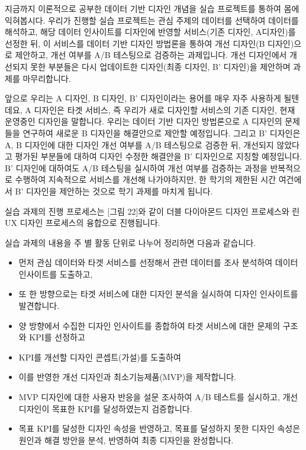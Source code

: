 \documentclass[
  letterpaper,
]{book}
\providecommand{\tightlist}{%
  \setlength{\itemsep}{0pt}\setlength{\parskip}{0pt}}\usepackage{longtable,booktabs,array}
\begin{document}
지금까지 이론적으로 공부한 데이터 기반 디자인 개념을 실습 프로젝트를
통하여 몸에 익혀봅시다. 우리가 진행할 실습 프로젝트는 관심 주제의
데이터를 선택하여 데이터를 해석하고, 해당 데이터 인사이트를 디자인에
반영할 서비스(기존 디자인, A디자인)를 선정한 뒤, 이 서비스를 데이터 기반
디자인 방법론을 통하여 개선 디자인(B 디자인)으로 제안하고, 개선 여부를
A/B 테스팅으로 검증하는 과제입니다. 개선 디자인에서 개선되지 못한
부분들은 다시 업데이트한 디자인(최종 디자인, B' 디자인)을 제안하며
과제를 마무리합니다.

앞으로 우리는 A 디자인, B 디자인, B' 디자인이라는 용어를 매우 자주
사용하게 될텐데요, A 디자인은 타겟 서비스, 즉 우리가 새로 디자인할
서비스의 기존 디자인, 현재 운영중인 디자인을 말합니다. 우리는 데이터
기반 디자인 방법론으로 A 디자인의 문제들을 연구하여 새로운 B 디자인을
해결안으로 제안할 예정입니다. 그리고 B' 디자인은 A, B 디자인에 대한
디자인 개선 여부를 A/B 테스팅으로 검증한 뒤, 개선되지 않았다고 평가된
부분들에 대하여 디자인 수정한 해결안을 B' 디자인으로 지칭할 예정입니다.
B' 디자인에 대하여도 A/B 테스팅을 실시하여 개선 여부를 검증하는 과정을
반복적으로 수행하여 지속적으로 서비스를 개선해 나가야하지만, 한 학기의
제한된 시간 여건에서 B' 디자인을 제안하는 것으로 학기 과제를 마치게
됩니다.

실습 과제의 진행 프로세스는 {[}그림 22{]}와 같이 더블 다이아몬드 디자인
프로세스와 린 UX 디자인 프로세스의 융합으로 진행됩니다.

실습 과제의 내용을 주 별 활동 단위로 나누어 정리하면 다음과 같습니다.

\begin{itemize}
\tightlist
\item
  먼저 관심 데이터와 타겟 서비스를 선정해서 관련 데이터를 조사 분석하여
  데이터 인사이트를 도출하고,
\item
  또 한 방향으로는 타겟 서비스에 대한 디자인 분석을 실시하여 디자인
  인사이트를 발견합니다.
\item
  양 방향에서 수집한 디자인 인사이트를 종합하여 타겟 서비스에 대한
  문제의 구조와 KPI를 선정하고
\item
  KPI를 개선할 디자인 콘셉트(가설)를 도출하여
\item
  이를 반영한 개선 디자인과 최소기능제품(MVP)을 제작합니다.
\item
  MVP 디자인에 대한 사용자 반응을 설문 조사하여 A/B 테스트를 실시하고,
  개선 디자인이 목표한 KPI를 달성하였는지 검증합니다.
\item
  목표 KPI를 달성한 디자인 속성을 반영하고, 목표를 달성하지 못한 디자인
  속성은 원인과 해결 방안을 분석, 반영하여 최종 디자인을 완성합니다.
\end{itemize}
\end{document}
